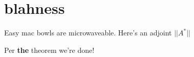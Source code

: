 \section{blahness}

\begin{theorem}
    Easy mac bowls are microwaveable. Here's an adjoint $||A^*||$
\end{theorem}

Per \textbf{the} theorem we're done!



